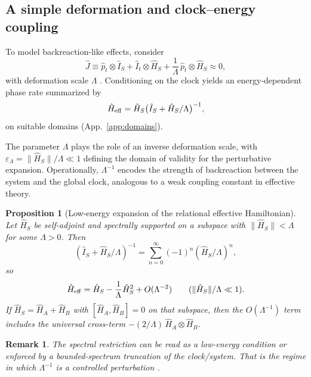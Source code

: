 \documentclass[11pt,a4paper]{article}
\theoremstyle{thmstyleone}
\newtheorem{proposition}[theorem]{Proposition}
\theoremstyle{thmstyletwo}
\newtheorem{remark}{Remark}
\theoremstyle{thmstylethree}
\newcommand{\epsilonL}{\varepsilon_\Lambda} %
\begin{document}
    \subsection{A simple deformation and clock--energy coupling}\label{subsec:deformations}
        To model backreaction-like effects, consider
        \begin{equation}
            \hat{J} \equiv \hat{p}_t\otimes \hat{I}_S + \hat{I}_t\otimes \hat{H}_S + \frac{1}{\Lambda}\,\hat{p}_t\otimes \hat{H}_S \approx 0,
            \label{eq:deformed_constraint}
        \end{equation}
        with deformation scale $\Lambda$ \cite{SinghFriedrich2025}. Conditioning on the clock yields an energy-dependent phase rate summarized by
        \begin{equation}
            \hat{H}_{\rm eff} = \hat{H}_S \bigl(\hat{I}_S + \hat{H}_S/\Lambda\bigr)^{-1},
            \label{eq:Heff}
        \end{equation}
        on suitable domains (App.~\ref{app:domains}).

        The parameter $\Lambda$ plays the role of an inverse deformation scale, with $\epsilonL = \lVert \hat{H}_S \rVert / \Lambda \ll 1$ defining the domain of validity for the perturbative expansion. Operationally, $\Lambda^{-1}$ encodes the strength of backreaction between the system and the global clock, analogous to a weak coupling constant in effective theory.

        \begin{proposition}[Low-energy expansion of the relational effective Hamiltonian]
            \label{prop:neumann}
            Let $\hat{H}_S$ be self-adjoint and spectrally supported on a subspace with $\|\hat{H}_S\|<\Lambda$ for some $\Lambda>0$. Then
            \[
                (\hat{I}_S+\hat{H}_S/\Lambda)^{-1}=\sum_{n=0}^{\infty}(-1)^n(\hat{H}_S/\Lambda)^n,
            \]
            so
            \[
                \hat{H}_{\rm eff}=\hat{H}_S-\frac{1}{\Lambda}\hat{H}_S^2+O(\Lambda^{-2}) \qquad (\|\hat{H}_S\|/\Lambda\ll 1).
            \]
            If $\hat{H}_S=\hat{H}_A+\hat{H}_B$ with $[\hat{H}_A,\hat{H}_B]=0$ on that subspace, then the $O(\Lambda^{-1})$ term includes the universal cross-term $-(2/\Lambda)\,\hat{H}_A\otimes \hat{H}_B$.
        \end{proposition}

        \begin{remark}
            The spectral restriction can be read as a low-energy condition or enforced by a bounded-spectrum truncation of the clock/system. That is the regime in which $\Lambda^{-1}$ is a controlled perturbation \cite{SinghFriedrich2025}.
        \end{remark}
\end{document}
